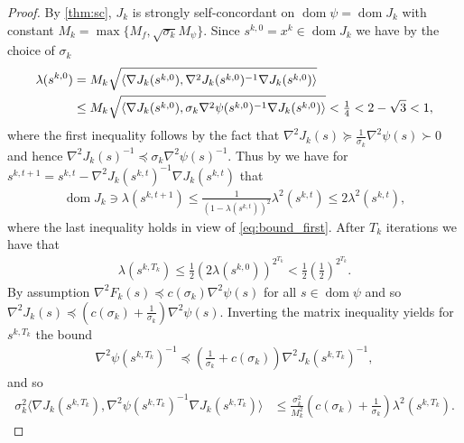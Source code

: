 \documentclass[11pt,onecolumn]{article}
\DeclareMathOperator{\dom}{dom}
\theoremstyle{remark}
\begin{document}
\begin{proof}
By \cref{thm:sc}, $J_k$ is strongly self-concordant on $\dom \psi=\dom J_k$ with constant $M_k=\max\{M_f, \sqrt{\sigma_k} M_\psi\}$. 
	Since $s^{k,0}=x^k \in \dom J_k$ we have by the choice of $\sigma_k$
	\begin{align} \label{eq:bound_first}
	\lambda(s^{k,0}) &=M_k\sqrt{\langle \nabla J_k(s^{k,0}), \nabla^2 J_k(s^{k,0})^{-1} \nabla J_k(s^{k,0})\rangle}\notag \\
	&\leq M_k\sqrt{\langle \nabla J_k(s^{k,0}), \sigma_k \nabla^2 \psi(s^{k,0})^{-1} \nabla J_k(s^{k,0})\rangle} < \tfrac{1}{4} < 2-\sqrt{3} < 1,
	\end{align}
	where the first inequality follows by the fact that $\nabla^2 J_k(s) \succeq \frac{1}{\sigma_k} \nabla^2 \psi(s) \succ 0$ and hence $\nabla^2 J_k(s)^{-1} \preceq \sigma_k \nabla^2 \psi(s)^{-1}$.
	Thus by \cite[Theorem 2.2.2(ii)]{nesterov1994interior} we have for $s^{k,t+1}=s^{k,t}-\nabla^2 J_k(s^{k,t})^{-1}\nabla J_k(s^{k,t})$ that
	\begin{align} \label{eq:quadratic_decrease_lambda}
	\dom J_k \ni \lambda (s^{k,t+1}) \leq \tfrac{1}{(1-\lambda(s^{k,t}))^2} \lambda^2(s^{k,t}) \leq 2 \lambda^2(s^{k,t}),
	\end{align}
	where the last inequality holds in view of \cref{eq:bound_first}.
	After $T_k$ iterations we have that
	\begin{align}\label{eq:bound_tk}
	\lambda(s^{k, T_k}) \leq \tfrac{1}{2} (2 \lambda(s^{k,0}))^{2^{T_k}} < \tfrac{1}{2} (\tfrac{1}{2})^{2^{T_k}}.
	\end{align}
By assumption $\nabla^2 F_k(s) \preceq c(\sigma_k) \nabla^2 \psi(s)$ for all $s \in \dom \psi$ and so $\nabla^2 J_k(s)\preceq (c(\sigma_k) +  \tfrac{1}{\sigma_k})\nabla^2 \psi(s)$. Inverting the matrix inequality yields for $s^{k,T_k}$ the bound
\begin{align} \label{eq:h_to_J_hessian_bound}
\nabla^2 \psi(s^{k,T_k})^{-1} \preceq (\tfrac{1}{\sigma_k}+c(\sigma_k))\nabla^2 J_k(s^{k,T_k})^{-1},
\end{align}
and so
\begin{align} \label{eq:hessian_sc_proof}
\sigma_k^2\langle \nabla J_k(s^{k,T_k}), \nabla^2 \psi(s^{k,T_k})^{-1} \nabla J_k(s^{k,T_k}) \rangle &\leq \tfrac{\sigma_k^2}{M_k^2}(c(\sigma_k) + \tfrac{1}{\sigma_k}) \lambda^2(s^{k,T_k}).
\end{align}

\end{proof}
\end{document}
